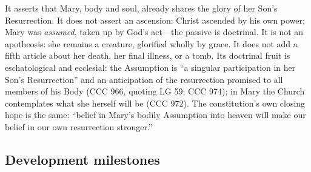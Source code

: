 It asserts that Mary, body and soul, already shares the glory of her
Son's Resurrection. It does not assert an ascension: Christ ascended by
his own power; Mary was \emph{assumed}, taken up by God's act---the
passive is doctrinal. It is not an apotheosis: she remains a creature,
glorified wholly by grace. It does not add a fifth article about her
death, her final illness, or a tomb. Its doctrinal fruit is
eschatological and ecclesial: the Assumption is ``a singular
participation in her Son's Resurrection'' and an anticipation of the
resurrection promised to all members of his Body (CCC 966, quoting LG
59; CCC 974); in Mary the Church contemplates what she herself will be
(CCC 972). The constitution's own closing hope is the same: ``belief in
Mary's bodily Assumption into heaven will make our belief in our own
resurrection stronger.''

\subsection*{Development milestones}

